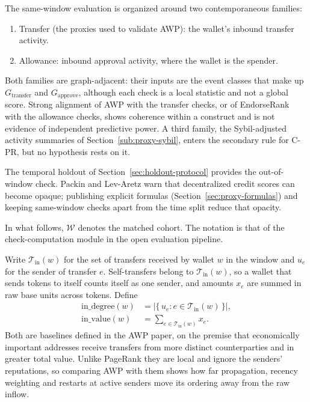 The same-window evaluation is organized around two contemporaneous families:
\begin{enumerate}
\item Transfer (the proxies used to validate AWP): the wallet's inbound transfer activity.
\item Allowance: inbound approval activity, where the wallet is the spender.
\end{enumerate}
Both families are graph-adjacent: their inputs are the event classes that make up $G_{\text{transfer}}$ and $G_{\text{approve}}$, although each check is a local statistic and not a global score. Strong alignment of AWP with the transfer checks, or of EndorseRank with the allowance checks, shows coherence within a construct and is not evidence of independent predictive power. A third family, the Sybil-adjusted activity summaries of Section~\ref{sub:proxy-sybil}, enters the secondary rule for C-PR, but no hypothesis rests on it.

The temporal holdout of Section~\ref{sec:holdout-protocol} provides the out-of-window check. Packin and Lev-Aretz warn that decentralized credit scores can become opaque; publishing explicit formulas (Section~\ref{sec:proxy-formulas}) and keeping same-window checks apart from the time split reduce that opacity.


In what follows, $\mathcal{W}$ denotes the matched cohort. The notation is that of the check-computation module in the open evaluation pipeline.


Write $\mathcal{T}_{\mathrm{in}}(w)$ for the set of transfers received by wallet $w$ in the window and $u_e$ for the sender of transfer $e$. Self-transfers belong to $\mathcal{T}_{\mathrm{in}}(w)$, so a wallet that sends tokens to itself counts itself as one sender, and amounts $x_e$ are summed in raw base units across tokens. Define
\begin{align}
\mathrm{in\_degree}(w)
&=
\bigl|\{\,u_e : e\in\mathcal{T}_{\mathrm{in}}(w)\,\}\bigr|,
\label{eq:in-degree}\\
\mathrm{in\_value}(w)
&=
\sum_{e\in\mathcal{T}_{\mathrm{in}}(w)} x_e.
\label{eq:in-value}
\end{align}
Both are baselines defined in the AWP paper, on the premise that economically important addresses receive transfers from more distinct counterparties and in greater total value. Unlike PageRank they are local and ignore the senders' reputations, so comparing AWP with them shows how far propagation, recency weighting and restarts at active senders move its ordering away from the raw inflow.

